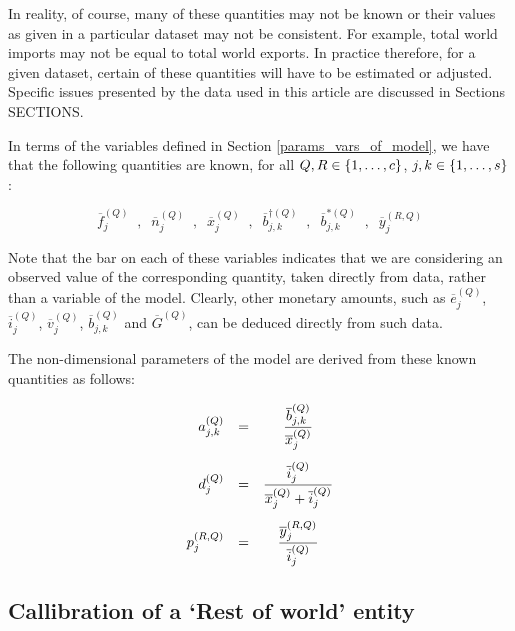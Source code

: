 \documentclass[preprint,authoryear,3p]{elsarticle}
\begin{document}
In reality, of course, many of these quantities may not be known or their values as given in a particular dataset may not be consistent. For example, total world imports may not be equal to total world exports. In practice therefore, for a given dataset, certain of these quantities will have to be estimated or adjusted. Specific issues presented by the data used in this article are discussed in Sections SECTIONS.

In terms of the variables defined in Section \ref{params_vars_of_model}, we have that the following quantities are known, for all $Q,R \in \{1, \mathellipsis, c \}$, $j,k \in \{1, \mathellipsis, s \}$:

$$
\overline{f}^{(Q)}_j \; \; , \; \; \overline{n}^{(Q)}_j \; \; , \; \; \overline{x}^{(Q)}_j \; \; , \; \; \overline{b}^{\dag (Q)}_{j,k} \; \; , \; \; \overline{b}^{* (Q)}_{j,k} \; \; , \; \; \overline{y}^{(R,Q)}_{j}
$$

Note that the bar on each of these variables indicates that we are considering an observed value of the corresponding quantity, taken directly from data, rather than a variable of the model. Clearly, other monetary amounts, such as $\overline{e}^{(Q)}_j$, $\overline{i}^{(Q)}_j$, $\overline{v}^{(Q)}_j$, $\overline{b}^{(Q)}_{j,k}$ and $\overline{G}^{(Q)}$, can be deduced directly from such data.

The non-dimensional parameters of the model are derived from these known quantities as follows:

\begin{align} \label{callibrate_params_from_data}
\begin{array}{rcc}
a^{(Q)}_{j,k} &=& \displaystyle \frac{\overline{b}^{(Q)}_{j,k}}{\overline{x}^{(Q)}_j} \vspace{3mm} \\
d^{(Q)}_j &=& \displaystyle \frac{\overline{i}^{(Q)}_j}{ \overline{x}^{(Q)}_j + \overline{i}^{(Q)}_j} \vspace{3mm} \\
p^{(R,Q)}_{j} &=& \displaystyle \frac{\overline{y}^{(R,Q)}_{j}}{\overline{i}^{(Q)}_j}
\end{array}
\end{align}





\subsection{Callibration of a `Rest of world' entity}
\end{document}
